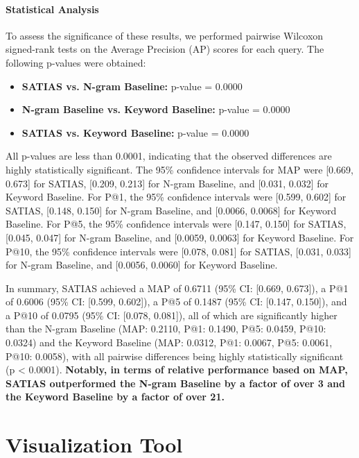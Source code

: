 \documentclass[manuscript,screen]{acmart}
\begin{document}
\paragraph{Statistical Analysis}

To assess the significance of these results, we performed pairwise Wilcoxon signed-rank tests on the Average Precision (AP) scores for each query. The following p-values were obtained:

\begin{itemize}
    \item \textbf{SATIAS vs. N-gram Baseline:} p-value = 0.0000
    \item \textbf{N-gram Baseline vs. Keyword Baseline:} p-value = 0.0000
    \item \textbf{SATIAS vs. Keyword Baseline:} p-value = 0.0000
\end{itemize}

All p-values are less than 0.0001, indicating that the observed differences are highly statistically significant. The 95\% confidence intervals for MAP were [0.669, 0.673] for SATIAS, [0.209, 0.213] for N-gram Baseline, and [0.031, 0.032] for Keyword Baseline. For P@1, the 95\% confidence intervals were [0.599, 0.602] for SATIAS, [0.148, 0.150] for N-gram Baseline, and [0.0066, 0.0068] for Keyword Baseline. For P@5, the 95\% confidence intervals were [0.147, 0.150] for SATIAS, [0.045, 0.047] for N-gram Baseline, and [0.0059, 0.0063] for Keyword Baseline. For P@10, the 95\% confidence intervals were [0.078, 0.081] for SATIAS, [0.031, 0.033] for N-gram Baseline, and [0.0056, 0.0060] for Keyword Baseline.

In summary, SATIAS achieved a MAP of 0.6711 (95\% CI: [0.669, 0.673]), a P@1 of 0.6006 (95\% CI: [0.599, 0.602]), a P@5 of 0.1487 (95\% CI: [0.147, 0.150]), and a P@10 of 0.0795 (95\% CI: [0.078, 0.081]), all of which are significantly higher than the N-gram Baseline (MAP: 0.2110, P@1: 0.1490, P@5: 0.0459, P@10: 0.0324) and the Keyword Baseline (MAP: 0.0312, P@1: 0.0067, P@5: 0.0061, P@10: 0.0058), with all pairwise differences being highly statistically significant (p < 0.0001).
\textbf{Notably, in terms of relative performance based on MAP, SATIAS outperformed the N-gram Baseline by a factor of over 3 and the Keyword Baseline by a factor of over 21.}

\section{Visualization Tool}
\end{document}

